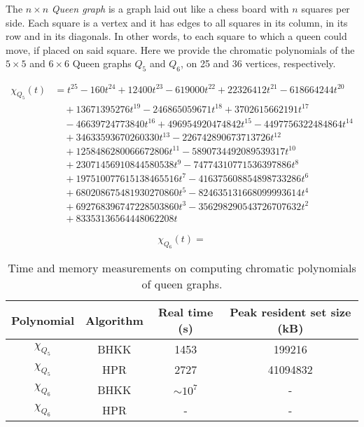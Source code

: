 \documentclass{cslthse-msc}
\begin{document}
The $n \times n$ \emph{Queen graph} is a graph laid out like a chess board with $n$ squares per side. Each square is a vertex and it has edges to all squares in its column, in its row and in its diagonals. In other words, to each square to which a queen could move, if placed on said square. Here we provide the chromatic polynomials of the $5 \times 5$ and $6 \times 6$ Queen graphs $Q_5$ and $Q_6$, on 25 and 36 vertices, respectively.

\begin{equation*}
\begin{split}
\chi_{Q_5}(t) & = t^{25} -160t^{24} + 12400t^{23} -619000t^{22} + 22326412t^{21} -618664244t^{20} \\ & \quad 
+ 13671395276t^{19} -246865059671t^{18} + 3702615662191t^{17} \\ & \quad
-46639724773840t^{16} + 496954920474842t^{15}  -4497756322484864t^{14} \\ & \quad 
+ 34633593670260330t^{13} -226742890673713726t^{12} \\ & \quad 
+ 1258486280066672806t^{11} -5890734492089539317t^{10} \\ & \quad 
+ 23071456910844580538t^9 -74774310771536397886t^8 \\ & \quad  
+ 197510077615138465516t^7 -416375608854898733286t^6  \\ & \quad 
+ 680208675481930270860t^5 -824635131668099993614t^4 \\ & \quad 
+ 692768396747228503860t^3 -356298290543726707632t^2  \\ & \quad 
+ 83353136564448062208t
\end{split}
\end{equation*}

\[
 \chi_{Q_6}(t) = 
\]

\begin{table}[H]\centering
\begin{tabular}{|c|c|c|c|} \hline
  Polynomial & Algorithm & Real time (s) & Peak resident set size (kB) \\ \hline
  $\chi_{Q_5}$ & BHKK & 1453 & 199216 \\ \hline
  $\chi_{Q_5}$ & HPR & 2727 & 41094832 \\ \hline
  $\chi_{Q_6}$ & BHKK & $\sim 10^{7}$ & - \\ \hline
  $\chi_{Q_6}$ & HPR & - & - \\ \hline
\end{tabular}
\caption{Time and memory measurements on computing chromatic polynomials of queen graphs.}
\end{table}
\end{document}
